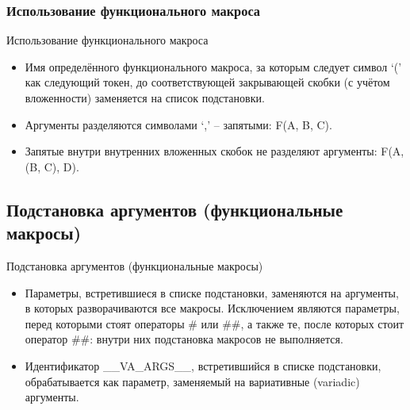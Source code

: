     \subsubsection{Использование функционального макроса}
    \begin{frame}{Использование функционального макроса}
        \begin{itemize}
            \item Имя определённого функционального макроса, за которым следует символ `(' как следующий токен,
                до соответствующей закрывающей скобки (с учётом вложенности) заменяется на список подстановки.
            \item Аргументы разделяются символами `,' -- запятыми: F(A, B, C).
            \item Запятые внутри внутренних вложенных скобок не разделяют аргументы: F(A, (B, C), D).
        \end{itemize}
    \end{frame}
    \subsection{Подстановка аргументов (функциональные макросы)}
    \begin{frame}{Подстановка аргументов (функциональные макросы)}
        \begin{itemize}
            \item Параметры, встретившиеся в списке подстановки, заменяются на аргументы,
                в которых разворачиваются все макросы. Исключением являются
                параметры, перед которыми стоят операторы \# или \#\#, а также те,
                после которых стоит оператор \#\#: внутри них подстановка макросов не выполняется.
            \item Идентификатор \_\_VA\_ARGS\_\_, встретившийся в списке подстановки,
                обрабатывается как параметр, заменяемый на вариативные (variadic) аргументы.
        \end{itemize}
    \end{frame}
